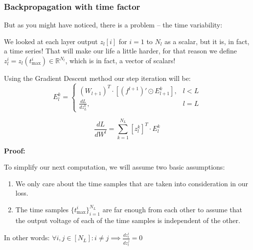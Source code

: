 \subsubsection{Backpropagation with time factor}

But as you might have noticed, there is a problem – the time variability:

We looked at each layer output \(z_l[i]\) for \(i=1\) to \(N_l\) as a scalar, but it is, in fact, a time series!
That will make our life a little harder, for that reason we define \(z_l^i = z_l(t_{\text{max}}^i) \in \mathbb{R}^{N_l}\), which is in fact, a vector of scalars!

\begin{mdframed}[backgroundcolor=red_background, linecolor=black, linewidth=2pt, frametitle=\textbf{Statement}]
\begin{center}

    \label{st:GD-cross-entr-convl-tempotron}
    Using the Gradient Descent method our step iteration will be:
    \begin{equation}
        E_l^k = \begin{cases} (W_{l+1})^T \cdot [(f^{l+1})' \odot E_{l+1}^k], & l < L \\ \frac{dL}{dz_L^k}, & l = L \end{cases}
    \end{equation}

    \begin{equation}
        \frac{dL}{dW^l} = \sum_{k=1}^{N_L} [z_l^k]^T \cdot E_l^k
    \end{equation}

\end{center}
\end{mdframed}

\textbf{Proof:}

To simplify our next computation, we will assume two basic assumptions:
\begin{enumerate}
    \item We only care about the time samples that are taken into consideration in our loss.

    \item The time samples \(\{t_{\text{max}}^i\}_{i=1}^{N_L}\) are far enough from each other to assume that the output voltage of each of the time samples is independent of the other.
\end{enumerate}

In other words: \(\forall i,j \in [N_L]: i \neq j \implies \frac{dz_l^i}{dz_l^j} = 0\)

